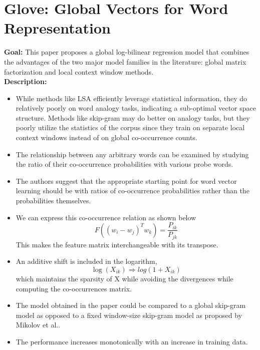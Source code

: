 \documentclass[11pt,a4paper]{article}
\begin{document}


\section{Glove: Global Vectors for Word Representation} %
\label{sec:glove_global_vectors_for_word_representation}

  \textbf{Goal:}
  This paper proposes a global log-bilinear regression model that combines the advantages of the two major model families in the literature: global matrix factorization and local context window methods\cite{pennington2014glove}.\\

  \textbf{Description:}
  \begin{itemize}
    \item
    While methods like LSA efficiently leverage statistical information, they do relatively poorly on word analogy tasks, indicating a sub-optimal vector space structure. Methods like skip-gram may do better on analogy tasks, but they poorly utilize the statistics of the corpus since they train on separate local context windows instead of on global co-occurrence counts.
    \item
    The relationship between any arbitrary words can be examined by studying the ratio of their co-occurrence probabilities with various probe words.
    \item
    The authors suggest that the appropriate starting point for word vector learning should be with ratios of co-occurrence probabilities rather than the probabilities themselves.
    \item
    We can express this co-occurrence relation as shown below
    $$F((w_i - w_j)^T w_k) = \frac{P_{ik}}{P_{jk}}$$
    This makes the feature matrix interchangeable with its transpose.
    \item
    An additive shift is included in the logarithm, $$\log(X_{ik}) \Rightarrow log(1 + X_{ik})$$ which maintains the sparsity of X while avoiding the divergences while computing the co-occurrences matrix.
    \item
    The model obtained in the paper could be compared to a global skip-gram model as opposed to a fixed window-size skip-gram model as proposed by Mikolov et al.\cite{mikolov2013efficient}.
    \item
    The performance increases monotonically with an increase in training data.
  \end{itemize}
\end{document}
